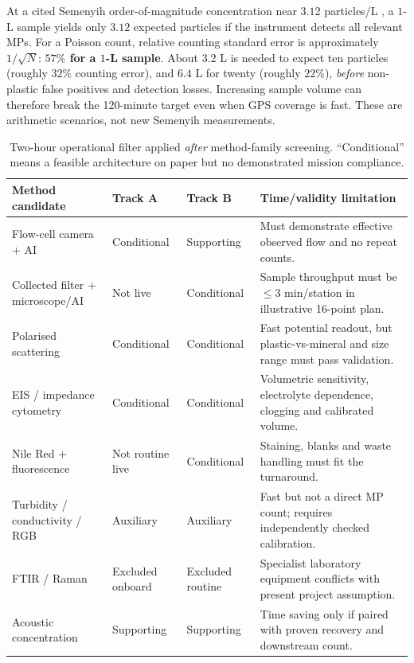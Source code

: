 \documentclass[10pt,a4paper]{article}
\begin{document}
At a cited Semenyih order-of-magnitude concentration near $3.12$ particles/L \cite{Chen2023}, a $1$-L sample yields only $3.12$ expected particles if the instrument detects all relevant MPs. For a Poisson count, relative counting standard error is approximately $1/\sqrt{N}$: \textbf{$57\%$ for a $1$-L sample}. About $3.2$ L is needed to expect ten particles (roughly $32\%$ counting error), and $6.4$ L for twenty (roughly $22\%$), \emph{before} non-plastic false positives and detection losses. Increasing sample volume can therefore break the 120-minute target even when GPS coverage is fast. These are arithmetic scenarios, not new Semenyih measurements.

\begin{table}[H]\centering\footnotesize
\caption{Two-hour operational filter applied \emph{after} method-family screening. ``Conditional'' means a feasible architecture on paper but no demonstrated mission compliance.}\label{tab:missionfilter}
\begin{tabularx}{\linewidth}{@{}L{3.3cm}L{1.9cm}L{1.9cm}Y@{}}\toprule
{}\textbf{Method candidate} & \textbf{Track A} & \textbf{Track B} & \textbf{Time/validity limitation}\\\midrule
Flow-cell camera + AI & Conditional & Supporting & Must demonstrate effective observed flow and no repeat counts.\\
Collected filter + microscope/AI & Not live & Conditional & Sample throughput must be $\leq3$ min/station in illustrative 16-point plan.\\
Polarised scattering & Conditional & Conditional & Fast potential readout, but plastic-vs-mineral and size range must pass validation.\\
EIS / impedance cytometry & Conditional & Conditional & Volumetric sensitivity, electrolyte dependence, clogging and calibrated volume.\\
Nile Red + fluorescence & Not routine live & Conditional & Staining, blanks and waste handling must fit the turnaround.\\
Turbidity / conductivity / RGB & Auxiliary & Auxiliary & Fast but not a direct MP count; requires independently checked calibration.\\
FTIR / Raman & Excluded onboard & Excluded routine & Specialist laboratory equipment conflicts with present project assumption.\\
Acoustic concentration & Supporting & Supporting & Time saving only if paired with proven recovery and downstream count.\\\bottomrule
\end{tabularx}\end{table}
\end{document}
